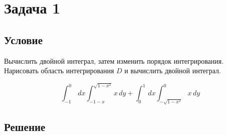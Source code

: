 \documentclass[12pt]{article}
\begin{document}
	\section*{Задача 1}	
	\subsection*{Условие}
	
	Вычислить двойной интеграл, затем изменить порядок интегрирования. Нарисовать область интегрирования $ D $ и вычислить двойной интеграл.
	
	$$ \int_{-1}^0 \,dx \int_{-1-x}^{\sqrt{1-x^2}} x \,dy +  \int_{0}^1 \,dx \int_{-\sqrt{1-x^2}}^{0} x \,dy$$

	\subsection*{Решение}
\end{document}
